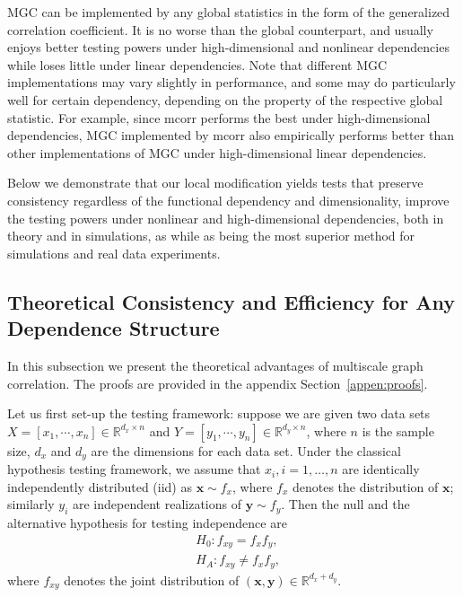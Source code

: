\documentclass[11pt]{article}
\providecommand{\mb}[1]{\boldsymbol{#1}}
\newcommand{\Real}{\mathbb{R}}
\begin{document}
MGC can be implemented by any global statistics in the form of the generalized correlation coefficient. It is no worse than the global counterpart, and usually enjoys better testing powers under high-dimensional and nonlinear dependencies while loses little under linear dependencies. Note that different MGC implementations may vary slightly in performance, and some may do particularly well for certain dependency, depending on the property of the respective global statistic. For example, since mcorr performs the best under high-dimensional dependencies, MGC implemented by mcorr also empirically performs better than other implementations of MGC under high-dimensional linear dependencies. %

Below we demonstrate that our local modification yields tests that preserve consistency regardless of the functional dependency and dimensionality, improve the testing powers under nonlinear and high-dimensional dependencies, both in theory and in simulations, as while as being the most superior method for simulations and real data experiments.


\subsection{Theoretical Consistency and Efficiency for Any Dependence Structure}
\label{main2}
In this subsection we present the theoretical advantages of multiscale graph correlation. The proofs are provided in the appendix Section~\ref{appen:proofs}. 

Let us first set-up the testing framework: suppose we are given two data sets $X=[x_{1},\cdots, x_{n}] \in \Real^{d_{x} \times n}$ and $Y=[y_{1},\cdots, y_{n}] \in \Real^{d_{y} \times n}$, where $n$ is the sample size, $d_{x}$ and $d_{y}$ are the dimensions for each data set. Under the classical hypothesis testing framework, we assume that $x_{i}, i=1,\ldots,n$ are identically independently distributed (iid) as $\mb{x} \sim f_{x}$, where $f_{x}$ denotes the distribution of $\mb{x}$; similarly $y_{i}$ are independent realizations of $\mb{y} \sim f_{y}$. Then the null and the alternative hypothesis for testing independence are
\begin{align*}
& H_{0}: f_{xy}=f_{x}f_{y},\\
& H_{A}: f_{xy} \neq f_{x}f_{y},
\end{align*}
where $f_{xy}$ denotes the joint distribution of $(\mb{x},\mb{y}) \in \Real^{d_{x} + d_{y}}$. 
\end{document}
